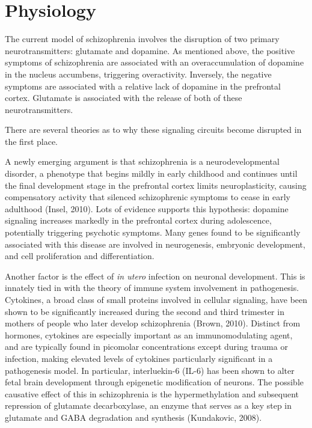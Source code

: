\documentclass[12pt,twoside]{reedthesis}
\begin{document}
	\section{Physiology}
	The current model of schizophrenia involves the disruption of two primary neurotransmitters: glutamate and dopamine. As mentioned above, the positive symptoms of schizophrenia are associated with an overaccumulation of dopamine in the nucleus accumbens, triggering overactivity. Inversely, the negative symptoms are associated with a relative lack of dopamine in the prefrontal cortex. Glutamate is associated with the release of both of these neurotransmitters. 
	
	There are several theories as to why these signaling circuits become disrupted in the first place. 
	
		A newly emerging argument is that schizophrenia is a neurodevelopmental disorder, a phenotype that begins mildly in early childhood and continues until the final development stage in the prefrontal cortex limits neuroplasticity, causing compensatory activity that silenced schizophrenic symptoms to cease in early adulthood (Insel, 2010). Lots of evidence supports this hypothesis: dopamine signaling increases markedly in the prefrontal cortex during adolescence, potentially triggering psychotic symptoms. Many genes found to be significantly associated with this disease are involved in neurogenesis, embryonic development, and cell proliferation and differentiation. 
		
		
		Another factor is the effect of \textit{in utero} infection on neuronal development. This is innately tied in with the theory of immune system involvement in pathogenesis. Cytokines, a broad class of small proteins involved in cellular signaling, have been shown to be significantly increased during the second and third trimester in mothers of people who later develop schizophrenia (Brown, 2010). Distinct from hormones, cytokines are especially important as an immunomodulating agent, and are typically found in picomolar concentrations except during trauma or infection, making elevated levels of cytokines particularly significant in a pathogenesis model. In particular, interluekin-6 (IL-6) has been shown to alter fetal brain development through epigenetic modification of neurons. The possible causative effect of this in schizophrenia is the hypermethylation and subsequent repression of glutamate decarboxylase, an enzyme that serves as a key step in glutamate and GABA degradation and synthesis (Kundakovic, 2008). 
		
\end{document}

